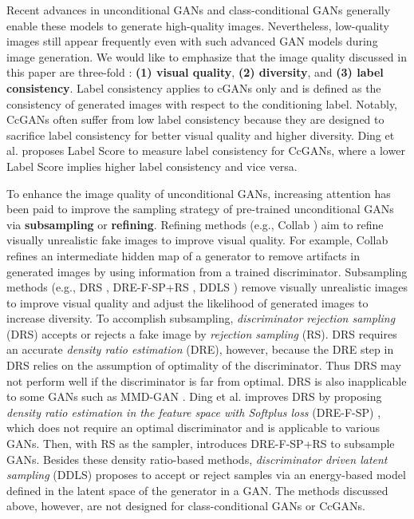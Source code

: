 \documentclass[final,12pt, 3p,times]{elsarticle}
\begin{document}
Recent advances in unconditional GANs \cite{karras2019style, karras2020analyzing} and class-conditional GANs \cite{brock2018large, ding2021ccgan, ding2020continuous} generally enable these models to generate high-quality images. Nevertheless, low-quality images still appear frequently even with such advanced GAN models during image generation. We would like to emphasize that the image quality discussed in this paper are three-fold \cite{miyato2018cgans, zhang2019self, devries2019evaluation, ding2021ccgan, ding2020continuous}: \textbf{(1) visual quality}, \textbf{(2) diversity}, and \textbf{(3) label consistency}. Label consistency applies to cGANs only and is defined as the consistency of generated images with respect to the conditioning label. Notably, CcGANs \cite{ding2021ccgan, ding2020continuous} often suffer from low label consistency because they are designed to sacrifice label consistency for better visual quality and higher diversity. Ding et al. \cite{ding2021ccgan, ding2020continuous} proposes Label Score to measure label consistency for CcGANs, where a lower Label Score implies higher label consistency and vice versa. 

To enhance the image quality of unconditional GANs, increasing attention has been paid to improve the sampling strategy of pre-trained unconditional GANs via \textbf{subsampling} or \textbf{refining}. Refining methods (e.g., Collab \cite{liu2020collaborative}) aim to refine visually unrealistic fake images to improve visual quality. For example, Collab \cite{liu2020collaborative} refines an intermediate hidden map of a generator to remove artifacts in generated images by using information from a trained discriminator. Subsampling methods (e.g., DRS \cite{azadi2018discriminator}, DRE-F-SP+RS \cite{ding2020subsampling}, DDLS \cite{che2020your}) remove visually unrealistic images to improve visual quality and adjust the likelihood of generated images to increase diversity. To accomplish subsampling, \textit{discriminator rejection sampling} (DRS) \cite{azadi2018discriminator} accepts or rejects a fake image by \textit{rejection sampling} (RS). DRS requires an accurate \textit{density ratio estimation} (DRE), however, because the DRE step in DRS relies on the assumption of optimality of the discriminator. Thus DRS may not perform well if the discriminator is far from optimal. DRS is also inapplicable to some GANs such as MMD-GAN \cite{li2017mmd}. Ding et al. improves DRS by proposing \textit{density ratio estimation in the feature space with Softplus loss} (DRE-F-SP) \cite{ding2020subsampling}, which does not require an optimal discriminator and is applicable to various GANs. Then, with RS as the sampler, \cite{ding2020subsampling} introduces DRE-F-SP+RS to subsample GANs. Besides these density ratio-based methods, \textit{discriminator driven latent sampling} (DDLS) \cite{che2020your} proposes to accept or reject samples via an energy-based model defined in the latent space of the generator in a GAN. The methods discussed above, however, are not designed for class-conditional GANs or CcGANs.
\end{document}
